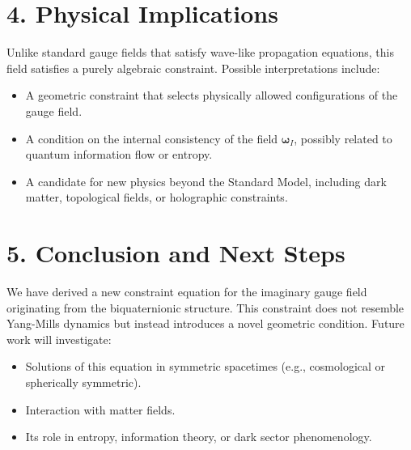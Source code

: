 \documentclass[12pt]{article}
\begin{document}
\section*{4. Physical Implications}

Unlike standard gauge fields that satisfy wave-like propagation equations, this field satisfies a purely algebraic constraint. Possible interpretations include:
\begin{itemize}
  \item A geometric constraint that selects physically allowed configurations of the gauge field.
  \item A condition on the internal consistency of the field \(\boldsymbol{\omega}_I\), possibly related to quantum information flow or entropy.
  \item A candidate for new physics beyond the Standard Model, including dark matter, topological fields, or holographic constraints.
\end{itemize}

\section*{5. Conclusion and Next Steps}

We have derived a new constraint equation for the imaginary gauge field originating from the biquaternionic structure. This constraint does not resemble Yang-Mills dynamics but instead introduces a novel geometric condition. Future work will investigate:
\begin{itemize}
  \item Solutions of this equation in symmetric spacetimes (e.g., cosmological or spherically symmetric).
  \item Interaction with matter fields.
  \item Its role in entropy, information theory, or dark sector phenomenology.
\end{itemize}
\end{document}

